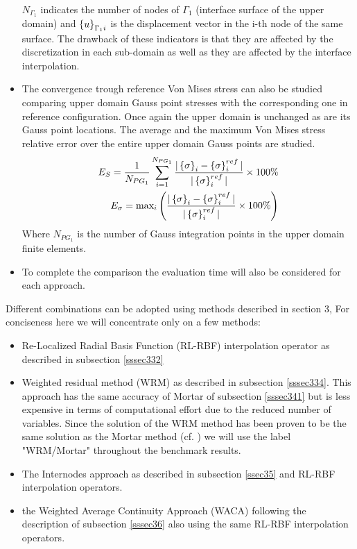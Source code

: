 \begin{itemize}
\begin{eqnarray}
 \end{eqnarray}
 $N_{\Gamma_1}$ indicates the number of nodes of $\Gamma_1$ (interface surface  of the upper domain) and $\left\lbrace{u}\right \rbrace_{\Gamma_1i}$ is the displacement vector in the i-th node of the same surface.
 The drawback of these indicators is that they are affected by the discretization in each sub-domain as well as they are affected by the interface interpolation.
 \item The convergence trough reference Von Mises stress can also be studied comparing upper domain Gauss point stresses with the corresponding one in reference configuration. Once again the upper domain is unchanged as are its Gauss point locations. The average and the maximum Von Mises stress relative error over the entire upper domain Gauss points are studied.
 \begin{eqnarray}
 E_{S}=\frac{1}{N_{PG_1}}\sum_{i=1}^{N_{PG_1}}\frac{|\left\lbrace{\sigma}\right \rbrace_{i}-\left\lbrace{\sigma}\right \rbrace^{ref}_{i}|}{|\left\lbrace{\sigma}\right \rbrace^{ref}_{i}|}\times 100 \%  \\
 E_{\sigma}=
 \text{max}_i
  \left(\frac{|\left\lbrace{\sigma}\right \rbrace_{i}-\left\lbrace{\sigma}\right \rbrace^{ref}_{i}|}{|\left\lbrace{\sigma}\right \rbrace^{ref}_{i}|}\times 100 \%   \right) 
 \end{eqnarray}
 Where $N_{PG_1}$ is the number of Gauss integration points in the upper domain finite elements.
 \item To complete the comparison the evaluation time will also be considered for each approach.
 \end{itemize}
 Different combinations can be adopted using methods described in section 3, For conciseness here we will concentrate only on a few methods:
 \begin{itemize}
     \item Re-Localized Radial Basis Function (RL-RBF) interpolation operator as described in subsection \ref{sssec332}
     \item Weighted residual method (WRM) as described in subsection \ref{sssec334}. This approach has the same accuracy of Mortar of subsection \ref{sssec341} but is less expensive in terms of computational effort due to the reduced number of variables. Since the solution of the WRM method has been proven to be the same solution as the Mortar method (cf. \cite{jeong2017element}) we will use the label "WRM/Mortar" throughout the benchmark results.
     \item The Internodes approach as described in subsection \ref{ssec35} and RL-RBF interpolation operators. 
     \item the Weighted Average Continuity Approach (WACA) following the description of subsection \ref{sssec36} also using the same RL-RBF interpolation operators.
 \end{itemize}
